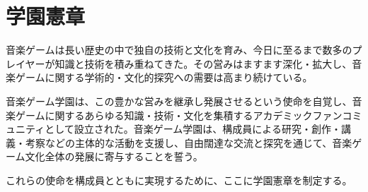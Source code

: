 \chapter*{学園憲章}

音楽ゲームは長い歴史の中で独自の技術と文化を育み、今日に至るまで数多のプレイヤーが知識と技術を積み重ねてきた。その営みはますます深化・拡大し、音楽ゲームに関する学術的・文化的探究への需要は高まり続けている。

音楽ゲーム学園は、この豊かな営みを継承し発展させるという使命を自覚し、音楽ゲームに関するあらゆる知識・技術・文化を集積するアカデミックファンコミュニティとして設立された。音楽ゲーム学園は、構成員による研究・創作・講義・考察などの主体的な活動を支援し、自由闊達な交流と探究を通じて、音楽ゲーム文化全体の発展に寄与することを誓う。

これらの使命を構成員とともに実現するために、ここに学園憲章を制定する。

